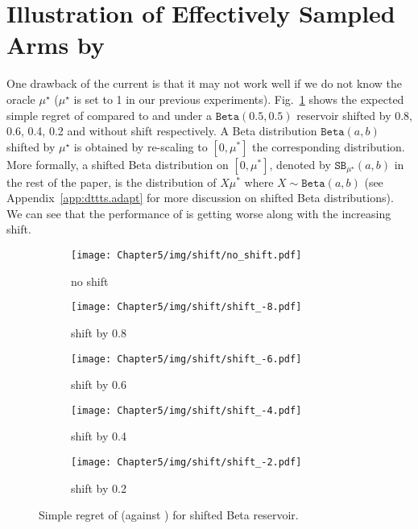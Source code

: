 \section{Illustration of Effectively Sampled Arms by \texorpdfstring{\DTTTS}{}}\label{app:dttts.arms}

One drawback of the current \DTTTS is that it may not work well if we do not know the oracle $\mu^\star$ ($\mu^\star$ is set to 1 in our previous experiments). Fig.~\ref{fig:shift} shows the expected simple regret of \DTTTS compared to \ISHA and \TTTS under a $\texttt{Beta}(0.5,0.5)$ reservoir shifted by 0.8, 0.6, 0.4, 0.2 and without shift respectively. A Beta distribution $\texttt{Beta}(a,b)$ shifted by $\mu^\star$ is obtained by re-scaling to $[0,\mu^*]$ the corresponding distribution. More formally, a shifted Beta distribution on $[0,\mu^*]$, denoted by  $\texttt{SB}_{\mu^\star}(a,b)$ in the rest of the paper, is the distribution of $X\mu^*$ where $X \sim \texttt{Beta}(a,b)$ (see Appendix~\ref{app:dttts.adapt} for more discussion on shifted Beta distributions). We can see that the performance of \DTTTS is getting worse along with the increasing shift.

\begin{figure}[ht]
  \centering
  \begin{subfigure}[t]{0.25\textwidth}
    \centering\texttt{[image: Chapter5/img/shift/no\_shift.pdf]}
    \caption{no shift}
  \end{subfigure}%
  \begin{subfigure}[t]{0.25\textwidth}
    \centering\texttt{[image: Chapter5/img/shift/shift\_-8.pdf]}
    \caption{shift by 0.8}
  \end{subfigure}
    \begin{subfigure}[t]{0.25\textwidth}
    \centering\texttt{[image: Chapter5/img/shift/shift\_-6.pdf]}
    \caption{shift by 0.6}
  \end{subfigure}%
  \begin{subfigure}[t]{0.25\textwidth}
    \centering\texttt{[image: Chapter5/img/shift/shift\_-4.pdf]}
    \caption{shift by 0.4}
  \end{subfigure}
  \begin{subfigure}[t]{0.25\textwidth}
    \centering\texttt{[image: Chapter5/img/shift/shift\_-2.pdf]}
    \caption{shift by 0.2}
  \end{subfigure}%
  \caption{Simple regret of \DTTTS (against \Hyperband) for shifted Beta reservoir.}
  \label{fig:shift}
\end{figure}

